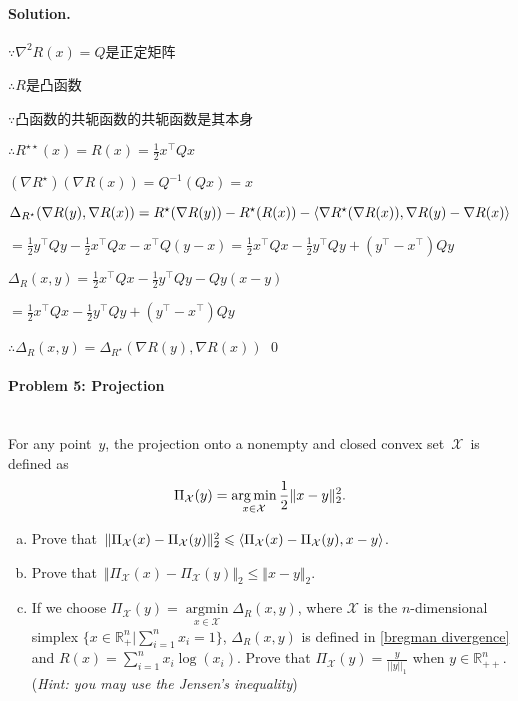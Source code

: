 \documentclass[a4paper]{article}
\newenvironment{solution}
{\color{blue} \paragraph{Solution.}}
{\newline \qed}
\begin{document}
\begin{solution}
$\because \nabla ^2 R(x)=Q$是正定矩阵

$\therefore R$是凸函数

$\because$凸函数的共轭函数的共轭函数是其本身

$\therefore R^{\star \star}(x)=R(x)=\frac{1}{2}x^{\top}Qx$

$(\nabla R^{\star})(\nabla R(x))=Q^{-1}(Qx)=x$

$\Delta_{R^{\star}}(\nabla R(y), \nabla R(x))=R^{\star}(\nabla R(y))-R^{\star}(R(x))-\Braket{ \nabla R^{\star}(\nabla R(x)), \nabla R(y)-\nabla R(x)}$

$=\frac{1}{2}y^{\top}Qy-\frac{1}{2}x^{\top}Qx-x^{\top}Q(y-x)=\frac{1}{2}x^{\top}Qx-\frac{1}{2}y^{\top}Qy+(y^{\top}-x^{\top})Qy$

$\Delta_{R}(x,y)=\frac{1}{2}x^{\top}Qx-\frac{1}{2}y^{\top}Qy-Qy(x-y)$

$=\frac{1}{2}x^{\top}Qx-\frac{1}{2}y^{\top}Qy+(y^{\top}-x^{\top})Qy$

$\therefore \Delta_{R}(x,y)=\Delta_{R^{\star}}(\nabla R(y), \nabla R(x))$
\end{solution}


\paragraph{Problem 5: Projection}
~\\

\noindent
For any point~$y$, the projection onto a nonempty and closed convex set~$\mathcal{X}$~is defined as
\begin{equation}
\Pi_{\mathcal{X}} (y) = \mathop{\arg\min}\limits_{x \in \mathcal{X}} \frac{1}{2} \Vert x - y \Vert^2_2. \notag
\end{equation}

\begin{enumerate}[a)]
    \item Prove that~$\Vert \Pi_{\mathcal{X}} (x) - \Pi_{\mathcal{X}} (y) \Vert^2_2 \leqslant \Braket{\Pi_{\mathcal{X}} (x) - \Pi_{\mathcal{X}} (y), x - y}$.

    \item Prove that~$\Vert \Pi_{\mathcal{X}} (x) - \Pi_{\mathcal{X}} (y) \Vert_2 \leqslant \Vert x - y \Vert_2$.
    
    \item If we choose $\Pi_{\mathcal{X}} (y) = \mathop{\arg\min}\limits_{x \in \mathcal{X}} \Delta_{R}(x,y) $, where $\mathcal{X}$ is the $n$-dimensional simplex $\{x\in\mathbb{R}^n_{+} \vert \sum_{i=1}^n x_i=1\}$, $\Delta_{R}(x,y)$ is defined in \eqref{bregman divergence} and $R(x)=\sum_{i=1}^n x_i\log(x_i)$. Prove that $\Pi_{\mathcal{X}} (y)=\frac{y}{||y||_1}$ when $y\in\mathbb{R}^n_{++}$. (\textit{Hint: you may use the Jensen’s inequality})
\end{enumerate}
\end{document}
